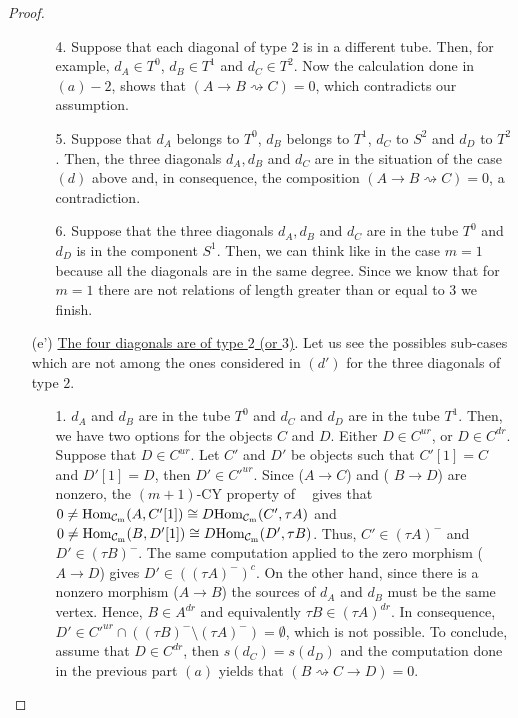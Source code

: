 \documentclass{amsart}
\theoremstyle{plain}
\theoremstyle{definition}
\begin{document}
\begin{proof}
\begin{itemize}
\begin{itemize}
        \item [4.] Suppose that each diagonal of type $2$ is in a  different tube. Then, for example,  $d_A\in T^0$, $d_B\in T^1$ and $d_C\in T^2$. Now  the calculation done in  $(a)-2$, shows that $(A\rightarrow B \rightsquigarrow C) =0$, which contradicts our assumption.\\

        \item [5.] Suppose that $d_A$  belongs to $T^0$, $d_B$  belongs to $T^1$, $d_C$  to $S^2$ and $d_D$ to $T^2$. Then, the three diagonals $d_A,d_B$ and $d_C$ are in the situation of the case $(d)$ above and, in  consequence, the composition $(A\rightarrow B \rightsquigarrow C) =0$, a contradiction.\\

        \item [6.] Suppose that the three  diagonals $d_A,d_B$ and $d_C$ are in the  tube $T^0$ and $d_D$ is in the component $S^1$. Then, we can think like  in the case $m=1$ because all the diagonals are in the same degree. Since we know that for $m=1$ there are not relations of length greater than or equal to $3$ we finish.\\

      \end{itemize}

  \item [(e')] \underline{The four diagonals are of type $2$ (or $3$)}. Let us see the  possibles sub-cases which are not among the ones considered  in $(d')$ for the three diagonals of type $2$.

      \begin{itemize}
        \item [1.] $d_A$ and $d_B$ are in the tube $T^0$ and $d_C$ and $d_D$ are in the tube $T^1$. Then, we have two options for the objects $C$ and $D$. Either $D\in C^{ur}$, or $D\in C^{dr}$. Suppose that  $D\in C^{ur}$. Let $C'$ and $D'$ be objects such that $C'[1]=C$ and $D'[1]=D$, then $D'\in C'^{ur}$. Since ($A\rightarrow C$) and ( $B\rightarrow D$) are nonzero, the $(m+1)$-CY property of ${\mathop{\mathcal{C}_m}\nolimits}$ gives that $0\neq {\mathop{\rm Hom_{\mathcal{C}_m}}\nolimits}(A,C'[1])\cong D {\mathop{\rm Hom_{\mathcal{C}_m}}\nolimits}(C',\tau A)$ and $0\neq {\mathop{\rm Hom_{\mathcal{C}_m}}\nolimits}(B,D'[1])\cong D {\mathop{\rm Hom_{\mathcal{C}_m}}\nolimits}(D',\tau B)$. Thus, $C'\in (\tau A)^-$ and $D'\in (\tau B)^-$. The same computation applied to the zero  morphism ($A\rightarrow D$) gives $D'\in ((\tau A)^-)^c$. On the other hand, since there is a nonzero morphism ($A\rightarrow B$) the sources of $d_A$ and $d_B$ must be the same vertex. Hence, $B\in A^{dr}$ and equivalently $\tau B\in (\tau A)^{dr}$. In consequence, $D'\in C'^{ur}\cap ((\tau B)^-\setminus (\tau A)^-)=\emptyset$, which is not possible. To conclude, assume that $D\in C^{dr}$, then $s(d_C)=s(d_D)$ and the computation done in the previous part $(a)$ yields that $(B \rightsquigarrow C \rightarrow D)=0$. \\


\end{itemize}
\end{itemize}
\end{proof}
\end{document}
